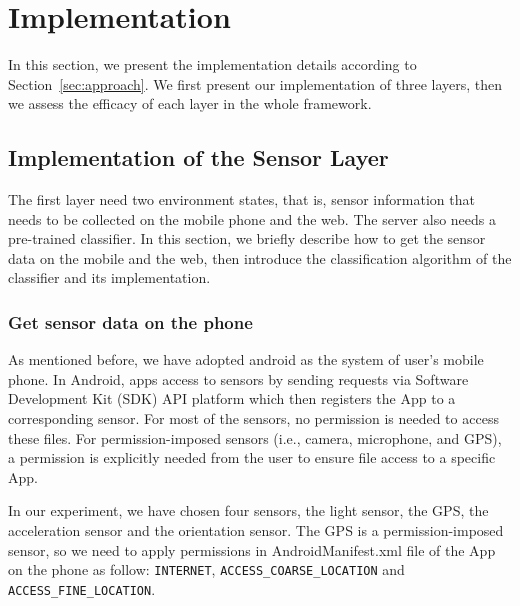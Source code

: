 \section{Implementation}
\label{sec:implementation}

In this section, we present the implementation details according to Section~\ref{sec:approach}. We first present our implementation of three layers, then we assess the efficacy of each layer in the whole framework.

\subsection{Implementation of the Sensor Layer}

The first layer need two environment states, that is, sensor information that needs to be collected on the mobile phone and the web. The server also needs a pre-trained classifier. In this section, we briefly describe how to get the sensor data on the mobile and the web, then introduce the classification algorithm of the classifier and its implementation. 

\subsubsection{Get sensor data on the phone}

As mentioned before, we have adopted android as the system of user's mobile phone. In Android, apps access to sensors by sending requests via Software Development Kit (SDK) API platform which then registers the App to a corresponding sensor. For most of the sensors, no permission is needed to access these files. For permission-imposed sensors (i.e., camera, microphone, and GPS), a permission is explicitly needed from the user to ensure file access to a specific App.





In our experiment, we have chosen four sensors, the light sensor, the GPS, the acceleration sensor and the orientation sensor. The GPS is a permission-imposed sensor, so we need to apply permissions in AndroidManifest.xml file of the App on the phone as follow:
\texttt{INTERNET}, \texttt{ACCESS\_COARSE\_LOCATION} and \texttt{ACCESS\_FINE\_LOCATION}.




